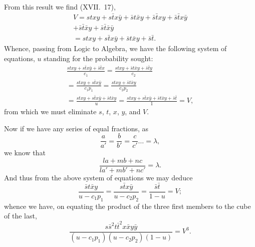 \documentclass[oneside]{book}
\begin{document}
From this result we find (XVII.~17),
\begin{gather*}
V=stxy + s \bar{t}x\bar{y} + \bar{s}t\bar{x}y + \bar{s}\bar{t}xy+\bar{s}\bar{t}x\bar{y} \\
+ \bar{s}\bar{t}\bar{x}y + \bar{s}\bar{t}\bar{x}\bar{y}\\
= stxy + s\bar{t}x\bar{y} + \bar{s}t\bar{x}y+\bar{s}\bar{t}.
\end{gather*}
Whence, passing from Logic to Algebra, we have the following
system of equations, $u$ standing for the probability sought:
\begin{equation*}\tag{7}
\begin{split}
 \frac{stxy + s\bar{t}x\bar{y} + \bar{s}\bar{t}x}{c_1}
=\frac{stxy + \bar{s}t\bar{x}y + \bar{s}\bar{t}y}{c_2} \\
=\frac{stxy + s\bar{t}x\bar{y}}{c_1 p_1}
=\frac{stxy + \bar{s}t\bar{x}y}{c_2 p_2} \\
=\frac{stxy + s\bar{t}x\bar{y} + \bar{s}t\bar{x}y}{u}
=\frac{stxy + s\bar{t}x\bar{y} + \bar{s}t\bar{x}y + \bar{s}\bar{t}}{1}
=V,
\end{split}
\end{equation*}
from which we must eliminate $s$, $t$, $x$, $y$, and $V$.

Now if we have any series of equal fractions, as
\begin{equation*}
\frac{a}{a'}=\frac{b}{b'}=\frac{c}{c'} \dotso =\lambda,
\end{equation*}
we know that
\begin{equation*}
\frac{la + mb + nc}{la' + mb' + nc'}=\lambda.
\end{equation*}
And thus from the above system of equations we may deduce
\begin{equation*}
 \frac{\bar{s}t\bar{x}y}{u-c_1 p_1}
=\frac{s\bar{t}x\bar{y}}{u-c_2 p_2}
=\frac{\bar{s}\bar{t}}{1-u}=V;
\end{equation*}
whence we have, on equating the product of the three first members
to the cube of the last,
\begin{equation*}\tag{8}
\frac{s \bar{s}^2 t \bar{t}^2 x \bar{x} y \bar{y}}
     {(u-c_1 p_1)(u-c_2 p_2)(1-u)}=V^3.
\end{equation*}
\end{document}
